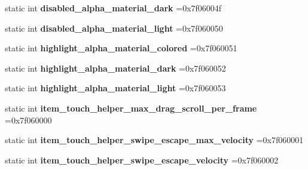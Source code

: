 \begin{DoxyCompactItemize}
static int {\bfseries disabled\+\_\+alpha\+\_\+material\+\_\+dark} =0x7f06004f
\item 
\mbox{\label{classandroid_1_1support_1_1v7_1_1appcompat_1_1R_1_1dimen_a24736607ad464cb275a88114845c6bd0}} 
static int {\bfseries disabled\+\_\+alpha\+\_\+material\+\_\+light} =0x7f060050
\item 
\mbox{\label{classandroid_1_1support_1_1v7_1_1appcompat_1_1R_1_1dimen_aee568c1cc9a03dc3245ebcf0302ae916}} 
static int {\bfseries highlight\+\_\+alpha\+\_\+material\+\_\+colored} =0x7f060051
\item 
\mbox{\label{classandroid_1_1support_1_1v7_1_1appcompat_1_1R_1_1dimen_ad2b7cb96b259a5806ad415ba3995b832}} 
static int {\bfseries highlight\+\_\+alpha\+\_\+material\+\_\+dark} =0x7f060052
\item 
\mbox{\label{classandroid_1_1support_1_1v7_1_1appcompat_1_1R_1_1dimen_ad03aeb512334c0f92ac33af39947e27a}} 
static int {\bfseries highlight\+\_\+alpha\+\_\+material\+\_\+light} =0x7f060053
\item 
\mbox{\label{classandroid_1_1support_1_1v7_1_1appcompat_1_1R_1_1dimen_a43096c9905ed8e045bf27f73ef384a8a}} 
static int {\bfseries item\+\_\+touch\+\_\+helper\+\_\+max\+\_\+drag\+\_\+scroll\+\_\+per\+\_\+frame} =0x7f060000
\item 
\mbox{\label{classandroid_1_1support_1_1v7_1_1appcompat_1_1R_1_1dimen_a7e209a46103b0d1df7c9a10b5971cb7f}} 
static int {\bfseries item\+\_\+touch\+\_\+helper\+\_\+swipe\+\_\+escape\+\_\+max\+\_\+velocity} =0x7f060001
\item 
\mbox{\label{classandroid_1_1support_1_1v7_1_1appcompat_1_1R_1_1dimen_a6b74746e943237530913934478f998ed}} 
static int {\bfseries item\+\_\+touch\+\_\+helper\+\_\+swipe\+\_\+escape\+\_\+velocity} =0x7f060002
\item 
\mbox{\label{classandroid_1_1support_1_1v7_1_1appcompat_1_1R_1_1dimen_a522e5c758c802e694635f14a674f2c84}} 

\end{DoxyCompactItemize}
